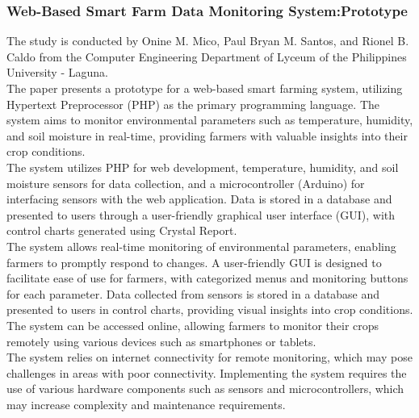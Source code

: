 \documentclass[12pt, a4paper]{article}
\begin{document}
\subsubsection{Web-Based Smart Farm Data Monitoring System:Prototype}
The study is conducted by Onine M. Mico, Paul Bryan M. Santos, and Rionel B. Caldo \cite{mico2016web} from the Computer Engineering Department of Lyceum of the Philippines University - Laguna.\\
The paper presents a prototype for a web-based smart farming system, utilizing Hypertext Preprocessor (PHP) as the primary programming language. The system aims to monitor environmental parameters such as temperature, humidity, and soil moisture in real-time, providing farmers with valuable insights into their crop conditions.\\
The system utilizes PHP for web development, temperature, humidity, and soil moisture sensors for data collection, and a microcontroller (Arduino) for interfacing sensors with the web application. Data is stored in a database and presented to users through a user-friendly graphical user interface (GUI), with control charts generated using Crystal Report.\\
The system allows real-time monitoring of environmental parameters, enabling farmers to promptly respond to changes. A user-friendly GUI is designed to facilitate ease of use for farmers, with categorized menus and monitoring buttons for each parameter. Data collected from sensors is stored in a database and presented to users in control charts, providing visual insights into crop conditions. The system can be accessed online, allowing farmers to monitor their crops remotely using various devices such as smartphones or tablets.\\
The system relies on internet connectivity for remote monitoring, which may pose challenges in areas with poor connectivity. Implementing the system requires the use of various hardware components such as sensors and microcontrollers, which may increase complexity and maintenance requirements.
\end{document}
